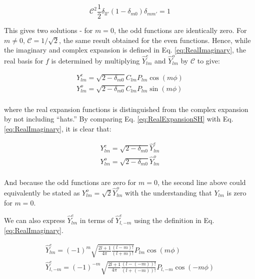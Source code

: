 \documentclass[10pt]{article}
\begin{document}
\begin{flushleft}
\begin{tcolorbox}[breakable]
\begin{equation}
\mathscr{C}^2\frac{1}{2}\delta_{ll'}(1-\delta_{m0})\delta_{mm'}=1
\end{equation} 

This gives two solutions - for \(m=0\), the odd functions are identically zero. For \(m\neq0\), \(\mathscr{C}=1/\sqrt{2}\), the same result obtained for the even functions. Hence, while the imaginary and complex expansion is defined in Eq. \eqref{eq:RealImaginary}, the real basis for \(f\) is determined by multiplying \(\hat{Y}_{lm}^e\) and \(\hat{Y}_{lm}^o\) by \(\mathscr{C}\) to give:

\begin{equation}
\label{eq:RealExpansionSH}
\begin{aligned}
Y_{lm}^e=\sqrt{2-\delta_{m0}}C_{lm}P_{lm}\cos{(m\phi)}\\
Y_{lm}^o=\sqrt{2-\delta_{m0}}C_{lm}P_{lm}\sin{(m\phi)}\\
\end{aligned}
\end{equation}

where the real expansion functions is distinguished from the complex expansion by not including ``hats.'' By comparing Eq. \eqref{eq:RealExpansionSH} with Eq. \eqref{eq:RealImaginary}, it is clear that:

\begin{equation}
\label{eq:HattoNoHat}
\begin{aligned}
Y_{lm}^e=\sqrt{2-\delta_{m0}}\hat{Y}_{lm}^e\\
Y_{lm}^o=\sqrt{2-\delta_{m0}}\hat{Y}_{lm}^o\\
\end{aligned}
\end{equation}

And because the odd functions are zero for \(m=0\), the second line above could equivalently be stated as \(Y_{lm}^o=\sqrt{2}\hat{Y}_{lm}^o\) with the understanding that \(Y_{lm}\) is zero for \(m=0\). 

\end{tcolorbox}

\begin{tcolorbox}[breakable]
We can also express \(\hat{Y}_{lm}^e\) in terms of \(\hat{Y}_{l,-m}^e\) using the definition in Eq. \eqref{eq:RealImaginary}. 

\begin{equation}
\begin{aligned}
\hat{Y}_{lm}^e=(-1)^m\sqrt{\frac{2l+1}{4\pi}\frac{(l-m)!}{(l+m)!}}P_{lm}\cos{(m\phi)}\\
\hat{Y}_{l,-m}^e=(-1)^{-m}\sqrt{\frac{2l+1}{4\pi}\frac{(l-(-m))!}{(l+(-m))!}}P_{l,-m}\cos{(-m\phi)}\\
\end{aligned}
\end{equation}


\end{tcolorbox}
\end{flushleft}
\end{document}

